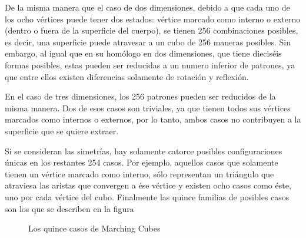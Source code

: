 De la misma manera que el caso de dos dimensiones, debido a que cada uno de los ocho 
vértices puede tener dos estados: vértice marcado como interno o externo (dentro o fuera de la 
superficie del cuerpo), se tienen 256 combinaciones posibles, es decir, una superficie puede
atravesar a un cubo de 256 maneras posibles. Sin embargo, al igual que en su homólogo en dos 
dimensiones, que tiene dieciséis formas posibles, estas pueden ser reducidas a un numero inferior 
de patrones, ya que entre ellos existen diferencias solamente de rotación y reflexión.

En el caso de tres dimensiones, los 256 patrones pueden ser reducidos de la misma 
manera. Dos de esos casos son triviales, ya que tienen todos sus vértices marcados como internos 
o externos, por lo tanto, ambos casos no contribuyen a la superficie que se quiere extraer.

Si se consideran las simetrías, hay solamente catorce posibles configuraciones únicas en 
los restantes 254 casos. Por ejemplo, aquellos casos que solamente tienen un vértice marcado 
como interno, sólo representan un triángulo que atraviesa las aristas que convergen a ése vértice y 
existen ocho casos como éste, uno por cada vértice del cubo.
Finalmente las quince familias de posibles casos son los que se describen en la figura \label{f:estadoDelArte:MarchingCubes}

\begin{figure}[hbp]
\centering
\caption{Los quince casos de Marching Cubes}
\label{f:estadoDelArte:MarchingCubes}
\end{figure}


